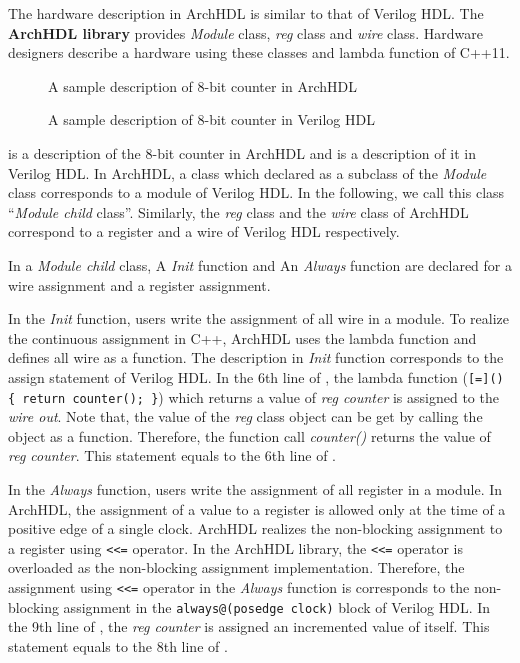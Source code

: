 The hardware description in ArchHDL is similar to that of Verilog HDL.
The \textbf{ArchHDL library} provides \textit{Module} class, \textit{reg} class and \textit{wire} class.
Hardware designers describe a hardware using these classes and lambda function of C++11.

\begin{figure}[t]
 
 \caption{A sample description of 8-bit counter in ArchHDL}
 \label{src:counter}
\end{figure}

\begin{figure}[t]
 
 \caption{A sample description of 8-bit counter in Verilog HDL}
 \label{src:counter_v}
\end{figure}

 is a description of the 8-bit counter in ArchHDL and
 is a description of it in Verilog HDL.
In ArchHDL, a class which declared as a subclass of the \textit{Module} class corresponds to a module of Verilog HDL.
In the following, we call this class ``\textit{Module child} class''.
Similarly, the \textit{reg} class and the \textit{wire} class of ArchHDL correspond to a register and a wire of Verilog HDL respectively. 

In a \textit{Module child} class, A \textit{Init} function and An \textit{Always} function are declared for a wire assignment and a register assignment.

In the \textit{Init} function, users write the assignment of all wire in a module.
To realize the continuous assignment in C++, ArchHDL uses the lambda function and defines all wire as a function.
The description in \textit{Init} function corresponds to the assign statement of Verilog HDL.
In the 6th line of , the lambda function (\texttt{[=]() \{ return counter(); \}}) which returns a value of \textit{reg counter} is assigned to the \textit{wire out}.
Note that, the value of the \textit{reg} class object can be get by calling the object as a function.
Therefore, the function call \textit{counter()} returns the value of \textit{reg counter}.
This statement equals to the 6th line of .

In the \textit{Always} function, users write the assignment of all register in a module.
In ArchHDL, the assignment of a value to a register is allowed only at the time of a positive edge of a single clock.
ArchHDL realizes the non-blocking assignment to a register using \verb`<<=` operator.
In the ArchHDL library, the \verb`<<=` operator is overloaded as the non-blocking assignment implementation.
Therefore, the assignment using \verb`<<=` operator in the \textit{Always} function is corresponds to the non-blocking assignment in the \texttt{always@(posedge clock)} block of Verilog HDL.
In the 9th line of , the \textit{reg counter} is assigned an incremented value of itself.
This statement equals to the 8th line of .

